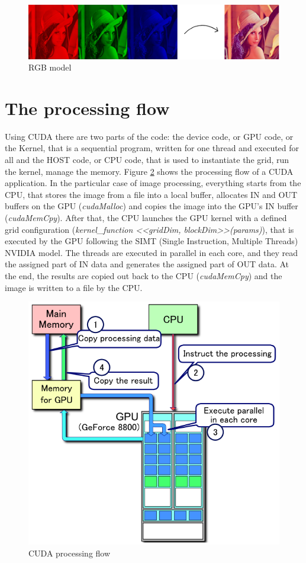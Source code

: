 \documentclass[a4paper]{article}
\begin{document}
\begin{figure}[!ht]
    \centering
    \includegraphics[width=0.7\linewidth]{rgb}
    \caption{RGB model}
    \label{fig:rgb}
\end{figure}
\FloatBarrier

\section{The processing flow}
\label{sec:cpf}
Using CUDA there are two parts of the code: the device code, or GPU code, or the Kernel, that is a sequential program, written for one thread and executed for all and the HOST code, or CPU code, that is used to instantiate the grid, run the kernel, manage the memory. Figure \ref{fig:flow} shows the processing flow of a CUDA application. In the particular case of image processing, everything starts from the CPU, that stores the image from a file into a local buffer, allocates IN and OUT buffers on the GPU (\textit{cudaMalloc}) and copies the image into the GPU's IN buffer (\textit{cudaMemCpy}). After that, the CPU launches the GPU kernel with a defined grid configuration (\textit{kernel\_function <<gridDim, blockDim>>(params)}), that is executed by the GPU following the SIMT (Single Instruction, Multiple Threads) NVIDIA model. The threads are executed in parallel in each core, and they read the assigned part of IN data and generates the assigned part of OUT data. At the end, the results are copied out back to the CPU (\textit{cudaMemCpy}) and the image is written to a file by the CPU.

\begin{figure}[!ht]
    \centering
    \includegraphics[width=0.5\linewidth]{flow}
    \caption{CUDA processing flow}
    \label{fig:flow}
\end{figure}
\FloatBarrier
\end{document}
